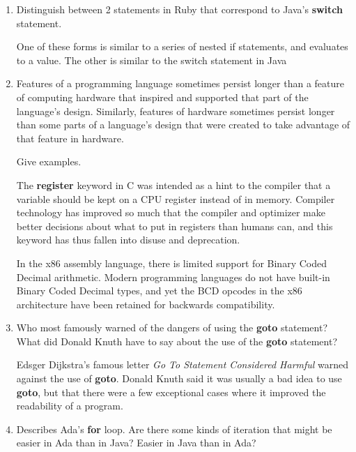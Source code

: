 \begin{enumerate}
  \item Distinguish between 2 statements in Ruby
    that correspond to Java's \textbf{switch} statement.

  \begin{answer}
    One of these forms is similar to a series of nested if statements, and 
    evaluates to a value. The other is similar to the switch statement in Java
    \end{answer}

  \item Features of a programming language sometimes persist
    longer than a feature of computing hardware that inspired
    and supported that part of the language's design.
    Similarly, features of hardware sometimes persist longer
    than some parts of a language's design that were created
    to take advantage of that feature in hardware.

    Give examples.

  \begin{answer}
    The \textbf{register} keyword in C was intended as a hint to the compiler
    that a variable should be kept on a CPU register instead of in memory. 
    Compiler technology has improved so much that the compiler and optimizer 
    make better decisions about what to put in registers than humans can, and
    this keyword has thus fallen into disuse and deprecation.

    In the x86 assembly language, there is limited support for Binary Coded 
    Decimal arithmetic. Modern programming languages do not have built-in 
    Binary Coded Decimal types, and yet the BCD opcodes in the x86 architecture have 
    been retained for backwards compatibility.
    \end{answer}

  \item Who most famously warned of the dangers of using the
    \textbf{goto} statement? What did Donald Knuth have to
    say about the use of the \textbf{goto} statement?

  \begin{answer}
    Edsger Dijkstra's famous letter \textit{Go To Statement Considered Harmful} 
    warned against the use of \textbf{goto}. Donald Knuth said it was usually a 
    bad idea to use \textbf{goto}, but that there were a few exceptional cases
    where it improved the readability of a program.
    \end{answer}

  \item Describes Ada's \textbf{for} loop. Are there some
    kinds of iteration that might be easier in Ada than
    in Java? Easier in Java than in Ada?


\end{enumerate}
